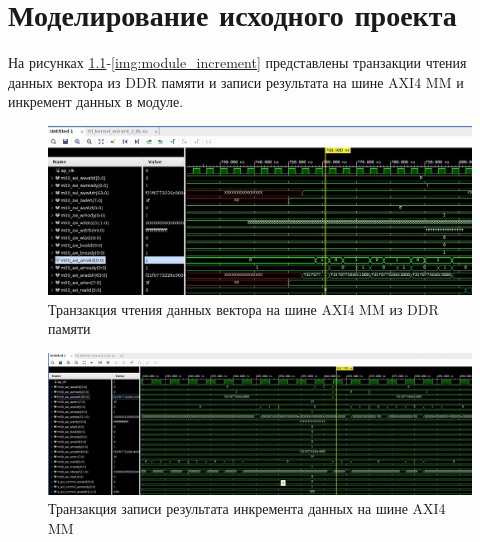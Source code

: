 \chapter{Моделирование исходного проекта}

На рисунках \ref{img:read}-\ref{img:module_increment} представлены транзакции чтения данных вектора из DDR памяти и записи результата на шине AXI4 MM и инкремент данных в модуле.

\begin{figure}[H]
	\begin{center}
		\includegraphics[scale=0.4]{img/read.png}
	\end{center}
	\captionsetup{justification=centering}
	\caption{Транзакция чтения данных вектора на шине AXI4 MM из DDR памяти}
	\label{img:read}
\end{figure}

\begin{figure}[H]
	\begin{center}
		\includegraphics[scale=0.2]{img/increment.png}
	\end{center}
	\captionsetup{justification=centering}
	\caption{Транзакция записи результата инкремента данных на шине AXI4 MM}
	\label{img:increment}
\end{figure}

